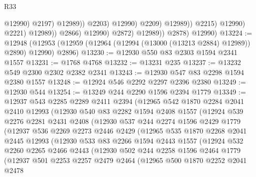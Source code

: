 \begin{lexlean}{R33}
\begin{coremodule}
                                              @12990)
                                            @2197)
                                          @12989))
                                      @2203)
                                    @12990)
                                  @2209)
                                @12989))
                            @2215)
                          @12990)
                        @2221)
                      @12989))
                  @2866)
                @12990)
              @2872)
            @12989))
        @2878)
      @12990)
@13224 := @12948
    (@12953 (@12959 (@12964 (@12994 (@13000 (@13213 @2884) @12989)) @2890) @12990) @2896)
@13230 := @12930 @550 @83 @2303 @1594 @2341 @1557
@13231 := @1768 @4768
@13232 := @13231 @235
@13237 := @13232 @549 @2300 @2302 @2382 @2341
@13243 := @12930 @547 @83 @2298 @1594 @2380 @1557
@13248 := @12924 @546 @2292 @2297 @2396 @2380
@13249 := @12930 @544
@13254 := @13249 @244 @2290 @1596 @2394 @1779
@13349 := @12937
    @543
    @2285
    @2289
    @2411
    @2394
    (@12965
      @542
      @1870
      @2284
      @2041
      @2410
      @12993
      (@12930
        @540
        @83
        @2282
        @1594
        @2408
        @1557
        (@12924
          @539
          @2276
          @2281
          @2431
          @2408
          (@12930
            @537
            @244
            @2274
            @1596
            @2429
            @1779
            (@12937
              @536
              @2269
              @2273
              @2446
              @2429
              (@12965
                @535
                @1870
                @2268
                @2041
                @2445
                @12993
                (@12930
                  @533
                  @83
                  @2266
                  @1594
                  @2443
                  @1557
                  (@12924
                    @532
                    @2260
                    @2265
                    @2466
                    @2443
                    (@12930
                      @502
                      @244
                      @2258
                      @1596
                      @2464
                      @1779
                      (@12937
                        @501
                        @2253
                        @2257
                        @2479
                        @2464
                        (@12965
                          @500
                          @1870
                          @2252
                          @2041
                          @2478

\end{coremodule}
\end{lexlean}
